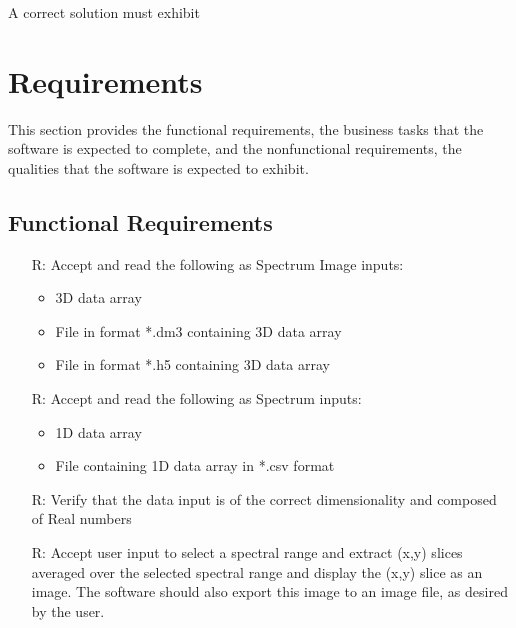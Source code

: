 \documentclass[12pt]{article}
\newcounter{reqnum} %
\begin{document}
\noindent
A correct solution must exhibit 

\section{Requirements}

This section provides the functional requirements, the business tasks that the
software is expected to complete, and the nonfunctional requirements, the
qualities that the software is expected to exhibit.

\subsection{Functional Requirements}

\noindent \begin{itemize}

\item[R\refstepcounter{reqnum}\thereqnum \label{R_Inputs}:] Accept and read the following as Spectrum Image inputs:

\begin{itemize}
	\item 3D data array
	\item File in format *.dm3 containing 3D data array
	\item File in format *.h5 containing 3D data array
\end{itemize}

\item[R\refstepcounter{reqnum}\thereqnum \label{R_Inputs}:] Accept and read the following as Spectrum inputs:

\begin{itemize}
	\item 1D data array
	\item File containing 1D data array in *.csv format
\end{itemize}

\item[R\refstepcounter{reqnum}\thereqnum \label{R_Inputs}:] Verify that the data input is of the correct dimensionality and composed of Real numbers

\item[R\refstepcounter{reqnum}\thereqnum \label{R_Inputs}:] Accept user input to select a spectral range and extract (x,y) slices averaged over the selected spectral range and display the (x,y) slice as an image. The software should also export this image to an image file, as desired by the user.


\end{itemize}
\end{document}
